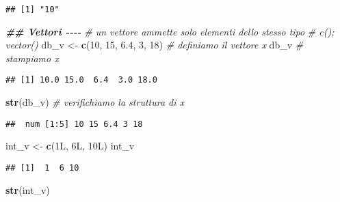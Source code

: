 \documentclass[
]{article}
\newenvironment{Shaded}{\begin{snugshade}}{\end{snugshade}}
\newcommand{\CommentTok}[1]{\textcolor[rgb]{0.56,0.35,0.01}{\textit{#1}}}
\newcommand{\DataTypeTok}[1]{\textcolor[rgb]{0.13,0.29,0.53}{#1}}
\newcommand{\DecValTok}[1]{\textcolor[rgb]{0.00,0.00,0.81}{#1}}
\newcommand{\DocumentationTok}[1]{\textcolor[rgb]{0.56,0.35,0.01}{\textbf{\textit{#1}}}}
\newcommand{\FloatTok}[1]{\textcolor[rgb]{0.00,0.00,0.81}{#1}}
\newcommand{\FunctionTok}[1]{\textcolor[rgb]{0.13,0.29,0.53}{\textbf{#1}}}
\newcommand{\NormalTok}[1]{#1}
\newcommand{\OtherTok}[1]{\textcolor[rgb]{0.56,0.35,0.01}{#1}}
\begin{document}
\begin{verbatim}
## [1] "10"
\end{verbatim}

\begin{Shaded}
\begin{Highlighting}[]
\DocumentationTok{\#\# Vettori {-}{-}{-}{-}}
\CommentTok{\# un vettore ammette solo elementi dello stesso tipo}
\CommentTok{\# c(); vector()}
\NormalTok{db\_v }\OtherTok{\textless{}{-}} \FunctionTok{c}\NormalTok{(}\DecValTok{10}\NormalTok{, }\DecValTok{15}\NormalTok{, }\FloatTok{6.4}\NormalTok{, }\DecValTok{3}\NormalTok{, }\DecValTok{18}\NormalTok{) }\CommentTok{\# definiamo il vettore x}
\NormalTok{db\_v                          }\CommentTok{\# stampiamo x}
\end{Highlighting}
\end{Shaded}

\begin{verbatim}
## [1] 10.0 15.0  6.4  3.0 18.0
\end{verbatim}

\begin{Shaded}
\begin{Highlighting}[]
\FunctionTok{str}\NormalTok{(db\_v)                     }\CommentTok{\# verifichiamo la struttura di x }
\end{Highlighting}
\end{Shaded}

\begin{verbatim}
##  num [1:5] 10 15 6.4 3 18
\end{verbatim}

\begin{Shaded}
\begin{Highlighting}[]
\NormalTok{int\_v }\OtherTok{\textless{}{-}} \FunctionTok{c}\NormalTok{(}\DecValTok{1}\DataTypeTok{L}\NormalTok{, }\DecValTok{6}\DataTypeTok{L}\NormalTok{, }\DecValTok{10}\DataTypeTok{L}\NormalTok{)}
\NormalTok{int\_v}
\end{Highlighting}
\end{Shaded}

\begin{verbatim}
## [1]  1  6 10
\end{verbatim}

\begin{Shaded}
\begin{Highlighting}[]
\FunctionTok{str}\NormalTok{(int\_v)}
\end{Highlighting}
\end{Shaded}
\end{document}
